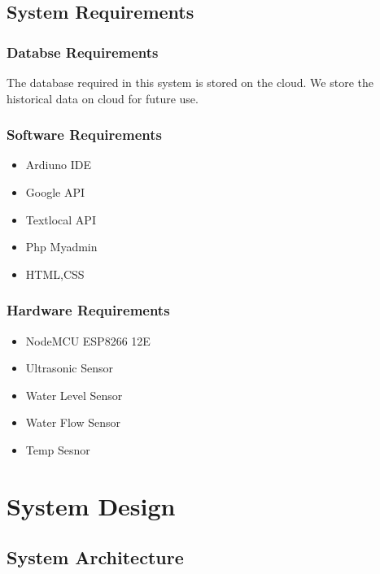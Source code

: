 \documentclass[a4paper,12pt]{report}
\begin{document}
\section{System Requirements}

\subsection{Databse Requirements}
The database required in this system is stored on the cloud. We store
the historical data on cloud for future use.

\subsection{Software Requirements }
\begin{itemize}
\item  Ardiuno IDE
\item  Google API
\item  Textlocal API
\item  Php Myadmin
\item  HTML,CSS
\end{itemize}

\subsection{Hardware Requirements}
\begin{itemize}
\item  NodeMCU ESP8266 12E
\item  Ultrasonic Sensor
\item  Water Level Sensor
\item  Water Flow Sensor
\item  Temp Sesnor
\end{itemize}


\chapter {System Design}
\section{System Architecture}
\end{document}
